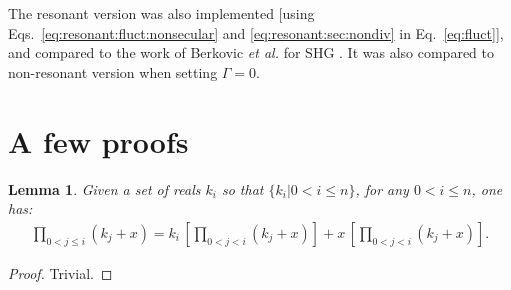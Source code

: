 \documentclass[12pt,a4paper]{article}
\begin{document}
The resonant version was also implemented [using Eqs.~\eqref{eq:resonant:fluct:nonsecular} and \eqref{eq:resonant:sec:nondiv} in Eq.~\eqref{eq:fluct}], and compared to the work of Berkovic \textit{et al.} for SHG \cite{berkovicMeasurementAnalysisMolecular2000}. It was also compared to non-resonant version when setting $\Gamma = 0$.






\clearpage
\appendix
\section{A few proofs}
\setcounter{equation}{0} 
\renewcommand{\theequation}{A\arabic{equation}}

\newtheorem{theorem}{Theorem}[section]
\newtheorem{lemma}[theorem]{Lemma}

\begin{lemma}\label{lem:1}
	Given a set of reals $k_i$ so that $\{k_i|0<i\leq n\}$,  for any $0<i\leq n$, one has:\begin{align}
		\prod_{0<j\leq i} (k_j+x)= k_{i}\,\left[\prod_{0<j<i} (k_j+x) \right] + x\,\left[\prod_{0<j<i} (k_j+x) \right].\label{eq:p1:ind}
	\end{align}
\end{lemma}
\begin{proof}
	Trivial.
\end{proof}
\end{document}
